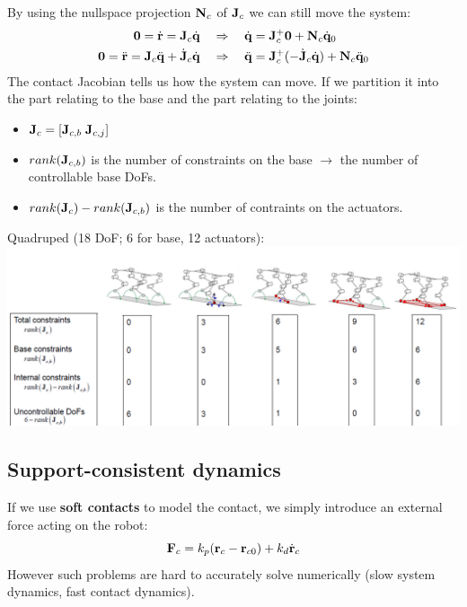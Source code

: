 \documentclass[a4paper, 8pt]{extarticle}
\begin{document}
\begin{multicols*}{3}
By using the nullspace projection ${\bf N}_c$ of ${\bf J}_c$ we can still move the system:
\begin{align*}
{\bf 0} = \dot{\bf r} = {\bf J}_c\dot{\bf q}   &\quad\Rightarrow\quad   \dot{\bf q} = {\bf J}_c^+ {\bf 0} + {\bf N}_c \dot{\bf q}_0 \\ 
{\bf 0} = \ddot{\bf r} = {\bf J}_c\ddot{\bf q} + \dot{\bf J}_c\dot{\bf q}  &\quad\Rightarrow\quad  \ddot{\bf q} = {\bf J}_c^+ (-\dot{\bf J}_c\dot{\bf q}) + {\bf N}_c \ddot{\bf q}_0 
\end{align*}
The contact Jacobian tells us how the system can move. If we partition it into the part relating to the base and the part relating to the joints: 
\begin{itemize}
\item ${\bf J}_c = [{\bf J}_{c,b} \; {\bf J}_{c,j} ]$
\item $rank({\bf J}_{c,b})$ is the number of constraints on the base $\rightarrow$ the number of controllable base DoFs.
\item $rank({\bf J}_c) - rank({\bf J}_{c,b})$ is the number of contraints on the actuators.
\end{itemize}

Quadruped (18 DoF; 6 for base, 12 actuators):\\
\includegraphics[width=1.05\linewidth]{images/Contraints_Quad.PNG}



\subsection{Support-consistent dynamics}
If we use {\bf soft contacts} to model the contact, we simply introduce an external force acting on the robot:
$${\bf F}_c = k_p({\bf r}_c - {\bf r}_{c0}) + k_d\dot{\bf r}_c$$
However such problems are hard to accurately solve numerically (slow system dynamics, fast contact dynamics). 


\end{multicols*}
\end{document}

